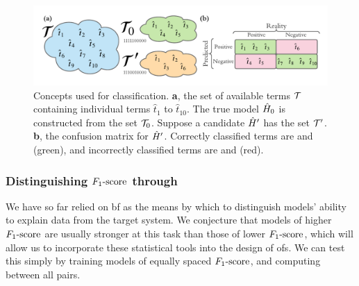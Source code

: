 \begin{figure}
    \begin{center}
        \includegraphics[width=\textwidth]{theoretical_study/figures/classication_example.pdf}
    \end{center}
    \caption[Classification concepts]{
        Concepts used for classification. 
        \textbf{a}, the set of available terms $\mathcal{T}$ containing individual terms $\hat{t}_1$ to $\hat{t}_{10}$. 
        The \gls{true model} $\hat{H}_0$ is constructed from the set $\mathcal{T}_0$. 
        Suppose a candidate $\hat{H}^{\prime}$ has the set $\mathcal{T}^{\prime}$. 
        \textbf{b}, the confusion matrix for $\hat{H}^{\prime}$. Correctly classified terms are  and  (green), 
            and incorrectly classified terms are  and  (red). 
    }
    \label{fig:classification_eg}
\end{figure}



\subsubsection{Distinguishing $ F_{1}\text{-score} $ through }\label{sec:bf_by_f_score}
We have so far relied on \gls{bf} as the means by which to distinguish models' 
    ability to explain data from the target system. 
We conjecture that models of higher $ F_{1}\text{-score} $ are usually stronger at this task than those of 
    lower $ F_{1}\text{-score} $, which will allow us to incorporate these statistical tools into the design of \glspl{of}. 
We can test this simply by training models of equally spaced $ F_{1}\text{-score} $, and computing  between all pairs.
\par 

